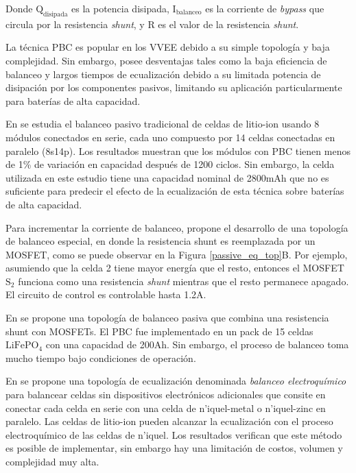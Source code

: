 \documentclass[10pt,a4paper]{article}
\begin{document}
Donde $\mathrm{Q_{disipada}}$ es la potencia disipada, $\mathrm{I_{balanceo}}$
es la corriente de \emph{bypass} que circula por la resistencia \emph{shunt}, y
R es el valor de la resistencia \emph{shunt}.

La t\'ecnica \acrshort{PBC} es popular en los \acrshort{VVEE} debido a su simple
topolog\'ia y baja complejidad. Sin embargo, posee desventajas tales como la
baja eficiencia de balanceo y largos tiempos de ecualizaci\'on debido a su
limitada potencia de disipaci\'on por los componentes pasivos, limitando su
aplicaci\'on particularmente para bater\'ias de alta capacidad.

En \cite{CAMPESTRINI2016142} se estudia el balanceo pasivo tradicional de celdas 
de litio-ion usando 8 m\'odulos conectados en serie, cada uno compuesto por 14 
celdas conectadas en paralelo (8s14p). Los resultados muestran que los m\'odulos 
con \acrshort{PBC} tienen menos de 1\% de variaci\'on en capacidad despu\'es de 
1200 ciclos. Sin embargo, la celda utilizada en este estudio tiene una capacidad
nominal de 2800mAh que no es suficiente para predecir el efecto de la
ecualizaci\'on de esta t\'ecnica sobre bater\'ias de alta capacidad.

Para incrementar la corriente de balanceo, \cite{XU20192948} propone el 
desarrollo de una topolog\'ia de balanceo especial, en donde la resistencia 
shunt es reemplazada por un MOSFET, como se puede observar en la Figura
\ref{passive_eq_top}B. Por ejemplo, asumiendo que la celda 2 tiene mayor
energ\'ia que el resto, entonces el MOSFET $\mathrm{S_2}$ funciona como una
resistencia \emph{shunt} mientras que el resto permanece apagado. El circuito de
control es controlable hasta 1.2A.

En \cite{amin_et_al_bal} se propone una topolog\'ia de balanceo pasiva que 
combina una resistencia shunt con MOSFETs. El \acrshort{PBC} fue implementado 
en un pack de 15 celdas $\mathrm{LiFePO_4}$ con una capacidad de 200Ah. Sin 
embargo, el proceso de balanceo toma mucho tiempo bajo condiciones de 
operaci\'on.

En \cite{SCHMID201749} se propone una topolog\'ia de ecualizaci\'on denominada 
\emph{balanceo electroqu\'imico} para balancear celdas sin dispositivos 
electr\'onicos adicionales que consite en conectar cada celda en serie con una 
celda de n'iquel-metal o n'iquel-zinc en paralelo. Las celdas de litio-ion pueden 
alcanzar la ecualizaci\'on con el proceso electroqu\'imico de las celdas de 
n'iquel. Los resultados verifican que este m\'etodo es posible de implementar, 
sin embargo hay una limitaci\'on de costos, volumen y complejidad muy alta.
\end{document}
